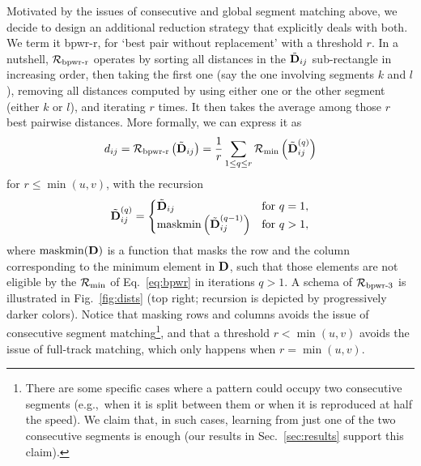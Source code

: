 Motivated by the issues of consecutive and global segment matching above, we decide to design an additional reduction strategy that explicitly deals with both. We term it bpwr-r, for `best pair without replacement' with a threshold $r$. In a nutshell, $\mathcal{R}_{\text{bpwr-r}}$ operates by sorting all distances in the $\tilde{\textbf{D}}_{ij}$ sub-rectangle in increasing order, then taking the first one (say the one involving segments $k$ and $l$), removing all distances computed by using either one or the other segment (either $k$ or $l$), and iterating $r$ times. It then takes the average among those $r$ best pairwise distances. More formally, we can express it as
\begin{equation}
d_{ij} = \mathcal{R}_{\text{bpwr-r}}\left(\tilde{\textbf{D}}_{ij}\right) = 
\frac{1}{r} \sum_{1\leq q\leq r} \mathcal{R}_{\text{min}}\left( \tilde{\textbf{D}}^{(q)}_{ij} \right) 
\label{eq:bpwr}
\end{equation}
for $r\leq\min(u,v)$, with the recursion
\begin{equation*}
\tilde{\textbf{D}}^{(q)}_{ij} = 
\begin{cases}
\tilde{\textbf{D}}_{ij}  & \text{for}~q=1, \\
\text{maskmin}\left(\tilde{\textbf{D}}^{(q-1)}_{ij}\right)  & \text{for}~q>1,
\end{cases}
\end{equation*}
where $\text{maskmin}(\textbf{D})$ is a function that masks the row and the column corresponding to the minimum element in $\textbf{D}$, %
such that those elements are not eligible by the $\mathcal{R}_{\text{min}}$ of Eq.~\ref{eq:bpwr} in iterations $q>1$. A schema of $\mathcal{R}_{\text{bpwr-3}}$ is illustrated in Fig.~\ref{fig:dists} (top right; recursion is depicted by progressively darker colors). Notice that masking rows and columns avoids the issue of consecutive segment matching\footnote{There are some specific cases where a pattern could occupy two consecutive segments (e.g.,~when it is split between them or when it is reproduced at half the speed). We claim that, in such cases, learning from just one of the two consecutive segments is enough (our results in Sec.~\ref{sec:results} support this claim).}, and that a threshold $r<\min(u,v)$ avoids the issue of full-track matching, which only happens when $r=\min(u,v)$.

